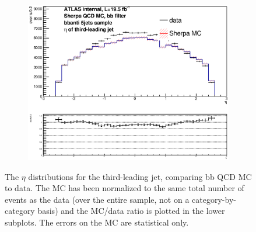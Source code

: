 \begin{figure}[phtb!]
\begin{center}
  \begin{subfigure}[$bbanti$ 5+ jet category]{0.3\textwidth}\includegraphics[width=\textwidth]{MonteCarlo/figures/eta2_bbanti_5jets.eps}\end{subfigure}
  \caption{The $\eta$ distributions for the third-leading jet, comparing bb QCD MC to data.  The MC has been normalized
  to the same total number of events as the data (over the entire sample, not on a category-by-category basis)
  and the MC/data ratio is plotted in the lower subplots.  The errors on the MC are statistical only.
  \label{fig:bb_qcd_mc_eta2}}
    \end{center}
\end{figure}








